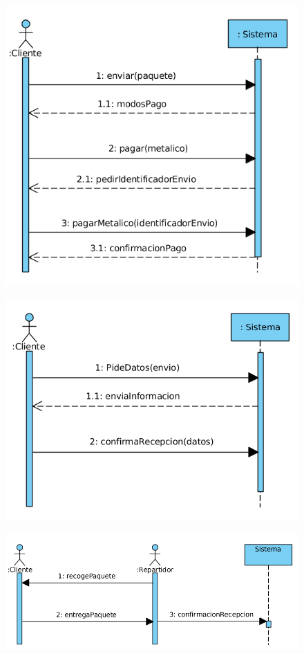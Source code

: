\begin{figure}[H]
	\centering
	\includegraphics[width=16cm]{44}
\end{figure}
\begin{figure}[H]
	\centering
	\includegraphics[width=16cm]{45}
\end{figure}
\begin{figure}[H]
	\centering
	\includegraphics[width=16cm]{46}
\end{figure}
